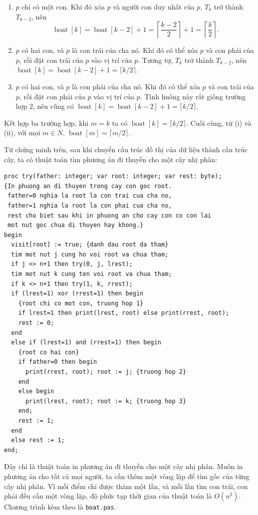 \documentclass[11pt]{article}
\begin{document}
\begin{enumerate}
  \item \(p\) chỉ có một con. Khi đó xóa \(p\) và người con duy nhất của
  \(p\), \(T_k\) trở thành \(T_{k-2}\), nên
  \[
    \operatorname{boat}[k]=\operatorname{boat}[k-2]+1
    =\left\lceil\frac{k-2}{2}\right\rceil+1
    =\left\lceil\frac{k}{2}\right\rceil .
  \]
  \item \(p\) có hai con, và \(p\) là con trái của cha nó. Khi đó có thể xóa
  \(p\) và con phải của \(p\), rồi đặt con trái của \(p\) vào vị trí của
  \(p\). Tương tự, \(T_k\) trở thành \(T_{k-2}\), nên
  \(\operatorname{boat}[k]=\operatorname{boat}[k-2]+1
  =\lceil k/2\rceil\).
  \item \(p\) có hai con, và \(p\) là con phải của cha nó. Khi đó có thể xóa
  \(p\) và con trái của \(p\), rồi đặt con phải của \(p\) vào vị trí của
  \(p\). Tình huống này rất giống trường hợp 2, nên cũng có
  \(\operatorname{boat}[k]=\operatorname{boat}[k-2]+1=\lceil k/2\rceil\).
\end{enumerate}
Kết hợp ba trường hợp, khi \(m=k\) ta có
\(\operatorname{boat}[k]=\lceil k/2\rceil\). Cuối cùng, từ (i) và (ii), với
mọi \(m\in N\), \(\operatorname{boat}[m]=\lceil m/2\rceil\).

Từ chứng minh trên, sau khi chuyển cấu trúc đồ thị của dữ liệu thành cấu trúc
cây, ta có thuật toán tìm phương án đi thuyền cho một cây nhị phân:

\begin{verbatim}
proc try(father: integer; var root: integer; var rest: byte);
{In phuong an di thuyen trong cay con goc root.
 father=0 nghia la root la con trai cua cha no,
 father=1 nghia la root la con phai cua cha no,
 rest cho biet sau khi in phuong an cho cay con co con lai
 mot nut goc chua di thuyen hay khong.}
begin
  visit[root] := true; {danh dau root da tham}
  tim mot nut j cung ho voi root va chua tham;
  if j <> n+1 then try(0, j, lrest);
  tim mot nut k cung ten voi root va chua tham;
  if k <> n+1 then try(1, k, rrest);
  if (lrest=1) xor (rrest=1) then begin
    {root chi co mot con, truong hop 1}
    if lrest=1 then print(lrest, root) else print(rrest, root);
    rest := 0;
  end
  else if (lrest=1) and (rrest=1) then begin
    {root co hai con}
    if father=0 then begin
      print(rrest, root); root := j; {truong hop 2}
    end
    else begin
      print(lrest, root); root := k; {truong hop 3}
    end;
    rest := 1;
  end
  else rest := 1;
end;
\end{verbatim}

Đây chỉ là thuật toán in phương án đi thuyền cho một cây nhị phân. Muốn in
phương án cho tất cả mọi người, ta cần thêm một vòng lặp để tìm gốc của từng
cây nhị phân. Vì mỗi điểm chỉ được thăm một lần, và mỗi lần tìm con trái,
con phải đều cần một vòng lặp, độ phức tạp thời gian của thuật toán là
\(O(n^2)\). Chương trình kèm theo là \texttt{boat.pas}.
\end{document}
